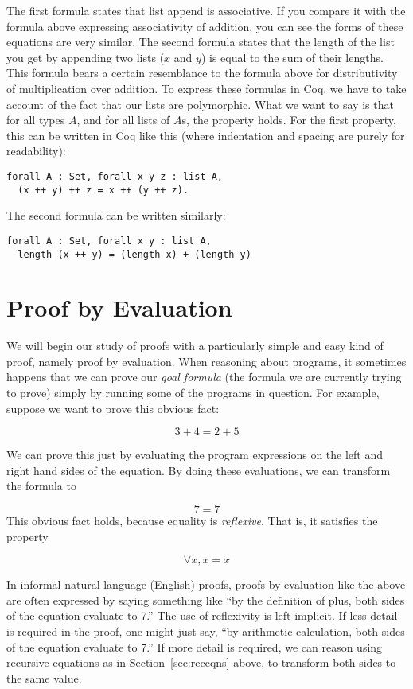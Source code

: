 \documentclass{book}[12pt]
\begin{document}
\noindent The first formula states that list append is associative.
If you compare it with the formula above expressing associativity of
addition, you can see the forms of these equations are very similar.
The second formula states that the length of the list you get by
appending two lists ($x$ and $y$) is equal to the sum of their
lengths.  This formula bears a certain resemblance to the formula
above for distributivity of multiplication over addition.  To express
these formulas in Coq, we have to take account of the fact that our
lists are polymorphic.  What we want to say is that for all types $A$,
and for all lists of $A$s, the property holds.  For the first
property, this can be written in Coq like this (where indentation and
spacing are purely for readability):

\begin{verbatim}
forall A : Set, forall x y z : list A, 
  (x ++ y) ++ z = x ++ (y ++ z).
\end{verbatim}

\noindent The second formula can be written similarly:

\begin{verbatim}
forall A : Set, forall x y : list A, 
  length (x ++ y) = (length x) + (length y)
\end{verbatim}

\section{Proof by Evaluation}

We will begin our study of proofs with a particularly simple and easy
kind of proof, namely proof by evaluation.  When reasoning about
programs, it sometimes happens that we can prove our \emph{goal
formula} (the formula we are currently trying to prove) simply by
running some of the programs in question.  For example, suppose we
want to prove this obvious fact:

\[ 3+4 = 2+5 
\]

\noindent We can prove this just by evaluating the program expressions
on the left and right hand sides of the equation.  By doing these
evaluations, we can transform the formula to

\[ 7 = 7
\]
\noindent This obvious fact holds, because equality is \emph{reflexive}.
That is, it satisfies the property

\[ \forall x, x = x
\]

\noindent In informal natural-language (English) proofs, proofs by
evaluation like the above are often expressed by saying something like
``by the definition of plus, both sides of the equation evaluate to
7.''  The use of reflexivity is left implicit.  If less detail is
required in the proof, one might just say, ``by arithmetic
calculation, both sides of the equation evaluate to 7.''  If more
detail is required, we can reason using recursive equations as in
Section~\ref{sec:receqns} above, to transform both sides to the same
value.
\end{document}
